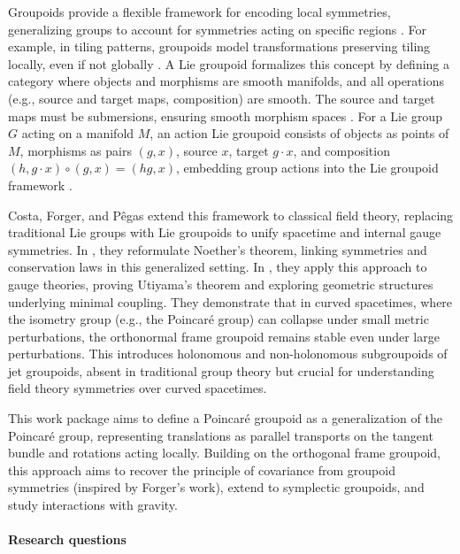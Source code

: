 \documentclass[11pt,a4paper]{article}
\begin{document}
Groupoids provide a flexible framework for encoding local symmetries, generalizing groups to account for symmetries acting on specific regions \cite{vistoli2011groupoids}. For example, in tiling patterns, groupoids model transformations preserving tiling locally, even if not globally \cite{weinstein1996groupoids}. A Lie groupoid formalizes this concept by defining a category where objects and morphisms are smooth manifolds, and all operations (e.g., source and target maps, composition) are smooth. The source and target maps must be submersions, ensuring smooth morphism spaces \cite{bursztyn2023lie}. For a Lie group \( G \) acting on a manifold \( M \), an action Lie groupoid consists of objects as points of \( M \), morphisms as pairs \( (g, x) \), source \( x \), target \( g \cdot x \), and composition \( (h, g \cdot x) \circ (g, x) = (hg, x) \), embedding group actions into the Lie groupoid framework \cite{bursztyn2023lie}.

Costa, Forger, and Pêgas extend this framework to classical field theory, replacing traditional Lie groups with Lie groupoids to unify spacetime and internal gauge symmetries. In \cite{Costa2018}, they reformulate Noether's theorem, linking symmetries and conservation laws in this generalized setting. In \cite{Costa2021}, they apply this approach to gauge theories, proving Utiyama's theorem and exploring geometric structures underlying minimal coupling. They demonstrate that in curved spacetimes, where the isometry group (e.g., the Poincaré group) can collapse under small metric perturbations, the orthonormal frame groupoid remains stable even under large perturbations. This introduces holonomous and non-holonomous subgroupoids of jet groupoids, absent in traditional group theory but crucial for understanding field theory symmetries over curved spacetimes.

This work package aims to define a Poincaré groupoid as a generalization of the Poincaré group, representing translations as parallel transports on the tangent bundle and rotations acting locally. Building on the orthogonal frame groupoid, this approach aims to recover the principle of covariance from groupoid symmetries (inspired by Forger's work), extend to symplectic groupoids, and study interactions with gravity.


\paragraph{Research questions}
\end{document}
